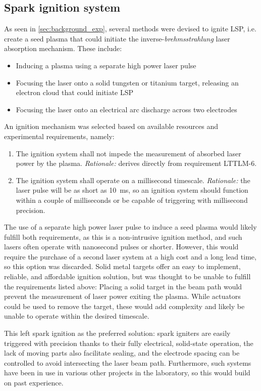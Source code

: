         \subsection{Spark ignition system}
            As seen in \autoref{sec:background_exp}, several methods were devised to ignite LSP, i.e. create a seed plasma that could initiate the inverse-\emph{brehmsstrahlung} laser absorption mechanism. These include:
            \begin{itemize}
                \item Inducing a plasma using a separate high power laser pulse
                \item Focusing the laser onto a solid tungsten or titanium target, releasing an electron cloud that could initiate LSP
                \item Focusing the laser onto an electrical arc discharge across two electrodes
            \end{itemize}
            An ignition mechanism was selected based on available resources and experimental requirements, namely:
            \begin{enumerate}
                \item The ignition system shall not impede the measurement of absorbed laser power by the plasma. \emph{Rationale:} derives directly from requirement LTTLM-6.
                \item The ignition system shall operate on a millisecond timescale. \emph{Rationale:} the laser pulse will be as short as 10~ms, so an ignition system should function within a couple of milliseconds or be capable of triggering with millisecond precision.
            \end{enumerate}
            The use of a separate high power laser pulse to induce a seed plasma would likely fulfill both requirements, as this is a non-intrusive ignition method, and such lasers often operate with nanosecond pulses or shorter. However, this would require the purchase of a second laser system at a high cost and a long lead time, so this option was discarded. Solid metal targets offer an easy to implement, reliable, and affordable ignition solution, but was thought to be unable to fulfill the requirements listed above: Placing a solid target in the beam path would prevent the measurement of laser power exiting the plasma. While actuators could be used to remove the target, these would add complexity and likely be unable to operate within the desired timescale.

            This left spark ignition as the preferred solution: spark igniters are easily triggered with precision thanks to their fully electrical, solid-state operation, the lack of moving parts also facilitate sealing, and the electrode spacing can be controlled to avoid intersecting the laser beam path. Furthermore, such systems have been in use in various other projects in the laboratory, so this would build on past experience.

